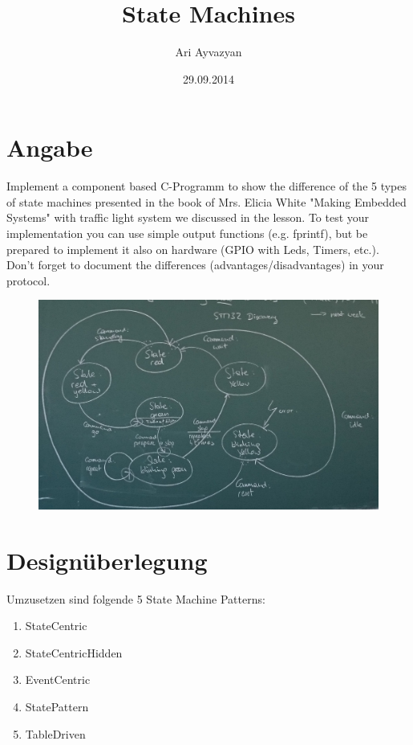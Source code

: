 \documentclass[12pt,a4paper,draft]{report}
\date{29.09.2014}
\author{Ari Ayvazyan}
\title{State Machines}
\begin{document}
\maketitle

\tableofcontents

\chapter{Angabe}
Implement a component based C-Programm to show the difference of the 5 types of state machines presented in the book of Mrs. Elicia White "Making Embedded Systems" with traffic light system we discussed in the lesson. To test your implementation you can use simple output functions (e.g. fprintf), but be prepared to implement it also on hardware (GPIO with Leds, Timers, etc.).
\newline
Don't forget to document the differences (advantages/disadvantages) in your protocol.

\begin{figure}[h]
\centering
\includegraphics[width=1\linewidth]{angabeTafel.png}
\label{fig:angabeTafel}
\end{figure}

\chapter{Designüberlegung}

Umzusetzen sind folgende 5 State Machine Patterns:
\newline
\begin{enumerate}
	\item StateCentric
	
	\item StateCentricHidden
	
	\item EventCentric
	
	\item StatePattern
	
	\item TableDriven
	
\end{enumerate}
\end{document}
